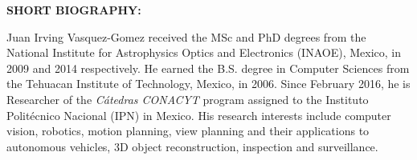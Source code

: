\item{\bf SHORT BIOGRAPHY:}

Juan Irving Vasquez-Gomez received the MSc and PhD degrees from the National Institute for Astrophysics Optics and Electronics (INAOE), Mexico, in 2009 and 2014 respectively. He earned the B.S. degree in Computer Sciences from the Tehuacan Institute of Technology, Mexico, in 2006. Since February 2016, he is Researcher of the \textit{Cátedras CONACYT} program assigned to the Instituto Politécnico Nacional (IPN) in Mexico. His research interests include  computer vision, robotics, motion planning, view planning and their applications to autonomous vehicles, 3D object reconstruction, inspection and surveillance.